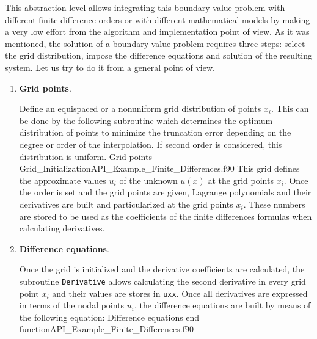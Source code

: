 This abstraction level allows integrating this boundary value problem with different finite-difference orders or with different mathematical models by making a very low effort from the algorithm and implementation point of view.  
As it was mentioned, the solution of a boundary value problem requires three steps: select the grid distribution, impose the difference equations and solution of the resulting system. 
Let us try to do it from a general point of view.  
  \begin{enumerate}
              \item {\textbf{Grid points}}.
              
              Define an equispaced or a nonuniform grid distribution of points ${x_i}$. 
              This can be done by the following subroutine which determines the optimum distribution of points to minimize the truncation error depending on the degree or order of the interpolation. If second order is considered, this distribution is uniform. 
              \vspace{0.5cm} 
               {Grid points}
               {Grid_Initialization}{API_Example_Finite_Differences.f90}
              This grid defines the approximate values $ u_i $ of the unknown  $ u(x) $ at the grid points $ x_i $.
              Once the order is set and the grid points are given, Lagrange polynomials and their derivatives are built and particularized at the grid points $ x_i$. These numbers are stored to be used as the coefficients of the finite differences formulas when calculating derivatives.
              
              
               \item {\textbf{Difference equations}}.  
               
               Once the grid is initialized and the derivative coefficients are calculated, the subroutine \verb|Derivative| allows calculating the second derivative in every grid point $ x_i$ and their values are stores in \verb|uxx|. 
               Once all derivatives are expressed in terms of the nodal points $ u_i $, the difference equations  are built by means of the following equation: 
               \vspace{0.5cm} 
                            {Difference equations}
                            {end function}{API_Example_Finite_Differences.f90}
                            

\end{enumerate}

